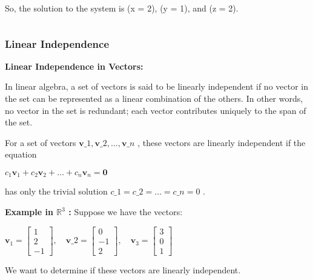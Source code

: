 \documentclass[11pt]{article}
\makeatletter
\newcommand{\boxspacing}{\kern\kvtcb@left@rule\kern\kvtcb@boxsep}
\newcommand{\prompt}[4]{
        {\ttfamily\llap{{\color{#2}[#3]:\hspace{3pt}#4}}\vspace{-\baselineskip}}
    }
\makeatother
\begin{document}
So, the solution to the system is (x = 2), (y = 1), and (z = 2).

    \begin{tcolorbox}[breakable, size=fbox, boxrule=1pt, pad at break*=1mm,colback=cellbackground, colframe=cellborder]
\prompt{In}{incolor}{ }{\boxspacing}
\begin{Verbatim}[commandchars=\\\{\}]

\end{Verbatim}
\end{tcolorbox}

    \hypertarget{linear-independence}{%
\subsubsection{Linear Independence}\label{linear-independence}}

    \textbf{Linear Independence in Vectors:}

In linear algebra, a set of vectors is said to be linearly independent
if no vector in the set can be represented as a linear combination of
the others. In other words, no vector in the set is redundant; each
vector contributes uniquely to the span of the set.

For a set of vectors $  \mathbf{v}\_1, \mathbf{v}\_2, \ldots,\mathbf{v}\_n$  , 
these vectors are linearly independent if the equation

$ c_1 \mathbf{v}_1 + c_2 \mathbf{v}_2 + \ldots + c_n \mathbf{v}_n= \mathbf{0}$ 

has only the trivial solution $  c\_1 = c\_2 = \ldots = c\_n = 0$  .

\textbf{Example in $  \mathbb{R}^3$  :} Suppose we have the vectors:

$  \mathbf{v}_1 =\begin{bmatrix} 1 \\ 2 \\ -1 \end{bmatrix}, \quad \mathbf{v}\_2 =\begin{bmatrix} 0 \\ -1 \\ 2 \end{bmatrix}, \quad \mathbf{v}_3 =\begin{bmatrix} 3 \\ 0 \\ 1 \end{bmatrix}$ 

We want to determine if these vectors are linearly independent.
\end{document}
